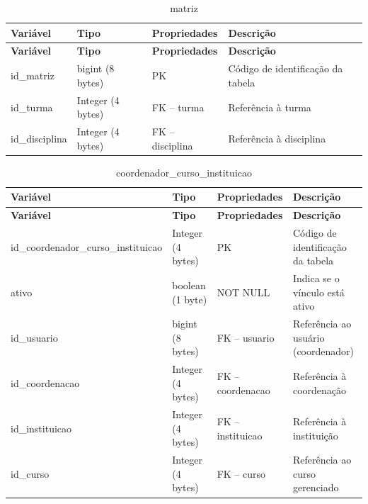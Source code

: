 \vspace{\baselineskip}

\Needspace{0.32\textheight}
\begin{longtable}{|L{5.2cm}|L{3.2cm}|L{2.4cm}|L{3.4cm}|}
\caption{matriz} \\
\hline
\textbf{Variável} & \textbf{Tipo} & \textbf{Propriedades} & \textbf{Descrição} \\
\hline
\endfirsthead
\hline
\textbf{Variável} & \textbf{Tipo} & \textbf{Propriedades} & \textbf{Descrição} \\
\hline
\endhead
id\_matriz & bigint (8 bytes) & PK & Código de identificação da tabela \\
\hline
id\_turma & Integer (4 bytes) & FK – turma & Referência à turma \\
\hline
id\_disciplina & Integer (4 bytes) & FK – disciplina & Referência à disciplina \\
\hline
\end{longtable}

\fonteautores

\vspace{\baselineskip}

\Needspace{0.32\textheight}
\begin{longtable}{|L{5.2cm}|L{3.2cm}|L{2.4cm}|L{3.4cm}|}
\caption{coordenador\_curso\_instituicao} \\
\hline
\textbf{Variável} & \textbf{Tipo} & \textbf{Propriedades} & \textbf{Descrição} \\
\hline
\endfirsthead
\hline
\textbf{Variável} & \textbf{Tipo} & \textbf{Propriedades} & \textbf{Descrição} \\
\hline
\endhead
id\_coordenador\_curso\_instituicao & Integer (4 bytes) & PK & Código de identificação da tabela \\
\hline
ativo & boolean (1 byte) & NOT NULL & Indica se o vínculo está ativo \\
\hline
id\_usuario & bigint (8 bytes) & FK – usuario & Referência ao usuário (coordenador) \\
\hline
id\_coordenacao & Integer (4 bytes) & FK – coordenacao & Referência à coordenação \\
\hline
id\_instituicao & Integer (4 bytes) & FK – instituicao & Referência à instituição \\
\hline
id\_curso & Integer (4 bytes) & FK – curso & Referência ao curso gerenciado \\
\hline
\end{longtable}

